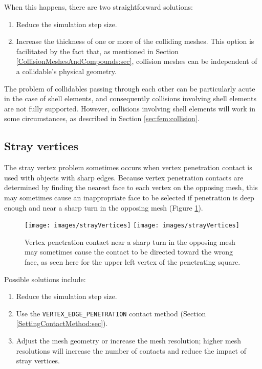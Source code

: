 When this happens, there are two straightforward solutions:

\begin{enumerate}

\item Reduce the simulation step size.

\item Increase the thickness of one or more of the colliding meshes.
This option is facilitated by the fact that, as mentioned in Section
\ref{CollisionMeshesAndCompounds:sec}, collision meshes can be independent
of a collidable's physical geometry.

\end{enumerate}

\begin{sideblock}
The problem of collidables passing through each other can be
particularly acute in the case of shell elements, and consequently
collisions involving shell elements are not fully supported.  However,
collisions involving shell elements will work in some circumstances,
as described in Section \ref{sec:fem:collision}.
\end{sideblock}

\subsection{Stray vertices}

The stray vertex problem sometimes occurs when vertex penetration
contact is used with objects with sharp edges. Because vertex
penetration contacts are determined by finding the nearest face to
each vertex on the opposing mesh, this may sometimes cause an
inappropriate face to be selected if penetration is deep enough and
near a sharp turn in the opposing mesh (Figure
\ref{strayVertices:fig}).

\begin{figure}[ht]
\begin{center}
\iflatexml
 \texttt{[image: images/strayVertices]}
\else
 \texttt{[image: images/strayVertices]}
\fi
\end{center}
\caption{Vertex penetration contact near a sharp turn in the
opposing mesh may sometimes cause the contact to be directed toward
the wrong face, as seen here for the upper left vertex of the
penetrating square.}
\label{strayVertices:fig}
\end{figure}

Possible solutions include:

\begin{enumerate}

\item Reduce the simulation step size.

\item Use the {\tt VERTEX\_EDGE\_PENETRATION} contact method (Section
\ref{SettingContactMethod:sec}).

\item Adjust the mesh geometry or increase the mesh resolution;
higher mesh resolutions will increase the number of contacts
and reduce the impact of stray vertices.

\end{enumerate}

